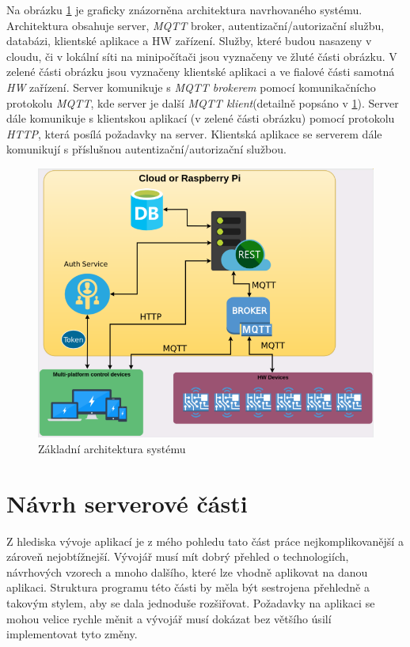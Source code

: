 Na obrázku \ref{figure:architektura} je graficky znázorněna architektura navrhovaného systému.
Architektura obsahuje server, \emph{MQTT} broker, autentizační/autorizační službu, databázi, klientské aplikace a HW zařízení.
Služby, které budou nasazeny v cloudu, či v lokální síti na minipočítači jsou vyznačeny ve žluté části obrázku.
V zelené části obrázku jsou vyznačeny klientské aplikaci a ve fialové části samotná \emph{HW} zařízení.
Server komunikuje s \emph{MQTT brokerem} pomocí komunikačnícho protokolu \emph{MQTT}, kde server je další \emph{MQTT klient}(detailně popsáno v \ref{navrh:backend}).
Server dále komunikuje s klientskou aplikací (v zelené části obrázku) pomocí protokolu \emph{HTTP}, která posílá požadavky na server.
Klientská aplikace se serverem dále komunikují s příslušnou autentizační/autorizační službou.

\begin{figure}[hbt]
  \centering
  \includegraphics[width=0.8 \linewidth]{obrazky-figures/navrh.png}
  \caption{Základní architektura systému}
  \label{figure:architektura}
\end{figure}

\section{Návrh serverové části}
\label{navrh:backend}
Z hlediska vývoje aplikací je z mého pohledu tato část práce nejkomplikovanější a zároveň nejobtížnejší.
Vývojář musí mít dobrý přehled o technologiích, návrhových vzorech a mnoho dalšího, které lze vhodně aplikovat na danou aplikaci.
Struktura programu této části by měla být sestrojena přehledně a takovým stylem, aby se dala jednoduše rozšiřovat.
Požadavky na aplikaci se mohou velice rychle měnit a vývojář musí dokázat bez většího úsilí implementovat tyto změny.

